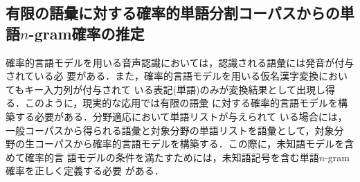 \subsection{有限の語彙に対する確率的単語分割コーパスからの単語$n$-gram確率の推定}

確率的言語モデルを用いる音声認識においては，認識される語彙には発音が付与されている必
要がある．また，確率的言語モデルを用いる仮名漢字変換においてもキー入力列が付与されて
いる表記(単語)のみが変換結果として出現し得る．このように，現実的な応用では有限の語彙
に対する確率的言語モデルを構築する必要がある．分野適応において単語リストが与えられて
いる場合には，一般コーパスから得られる語彙と対象分野の単語リストを語彙として，対象分
野の生コーパスから確率的言語モデルを構築する．この際に，未知語モデルを含めて確率的言
語モデルの条件を満たすためには，未知語記号を含む単語$n$-gram確率を正しく定義する必要
がある．

